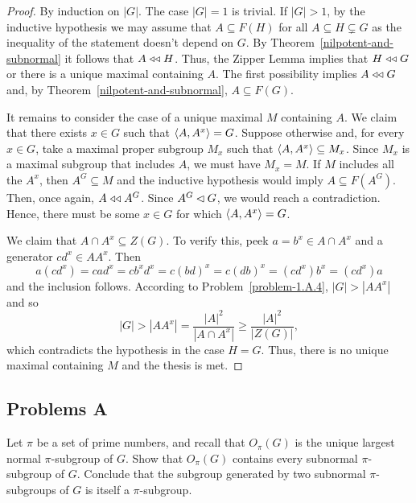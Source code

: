 \begin{proof} By induction on $|G|$. The case $|G|=1$ is trivial. If $|G|>1$, by the inductive hypothesis we may assume that $A\subseteq F(H)$ for all $A\subseteq H\varsubsetneq G$ as the inequality of the statement doesn't depend on $G$. By Theorem~\ref{nilpotent-and-subnormal} it follows that $A\mathrel{\triangleleft\triangleleft} H$. Thus, the Zipper Lemma implies that $H\mathrel{\triangleleft\triangleleft} G$ or there is a unique maximal containing $A$. The first possibility implies $A\mathrel{\triangleleft\triangleleft} G$ and, by Theorem~\ref{nilpotent-and-subnormal}, $A\subseteq F(G)$.

It remains to consider the case of a unique maximal $M$ containing $A$. We claim that there exists $x\in G$ such that $\langle A,A^x\rangle=G$. Suppose otherwise and, for every $x\in G$, take a maximal proper subgroup $M_x$ such that $\langle A,A^x\rangle\subseteq M_x$. Since $M_x$ is a maximal subgroup that includes $A$, we must have $M_x=M$. If $M$ includes all the $A^x$, then $A^G\subseteq M$ and the inductive hypothesis would imply $A\subseteq F(A^G)$. Then, once again, $A\mathrel{\triangleleft\triangleleft} A^G$. Since $A^G\lhd G$, we would reach a contradiction. Hence, there must be some $x\in G$ for which $\langle A,A^x\rangle=G$.

We claim that $A\cap A^x\subseteq Z(G)$. To verify this, peek $a=b^x\in A\cap A^x$ and a generator $cd^x\in AA^x$. Then
$$
    a(cd^x) = cad^x = cb^xd^x=c(bd)^x=c(db)^x=(cd^x)b^x=(cd^x)a
$$
and the inclusion follows. According to Problem~\ref{problem-1.A.4}, $|G|>|AA^x|$ and so
$$
    |G| > |AA^x| = \frac{|A|^2}{|A\cap A^x|}\ge \frac{|A|^2}{|Z(G)|},
$$
which contradicts the hypothesis in the case $H=G$. Thus, there is no unique maximal containing $M$ and the thesis is met.  \end{proof}

\subsection{Problems A}

\begin{probl}
    Let $\pi$ be a set of prime numbers, and recall that\/ $O_\pi(G)$ is the unique largest normal $\pi$-subgroup of\/ $G$. Show that\/ $O_\pi(G)$ contains every subnormal $\pi$-subgroup of\/ $G$. Conclude that the subgroup generated by two subnormal $\pi$-subgroups of\/ $G$ is itself a $\pi$-subgroup.
\end{probl}


